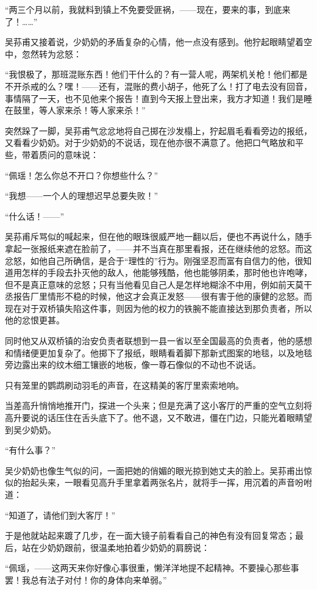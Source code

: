 \par “两三个月以前，我就料到镇上不免要受匪祸，——现在，要来的事，到底来了！……”
\par 吴荪甫又接着说，少奶奶的矛盾复杂的心情，他一点没有感到。他狞起眼睛望着空中，忽然转为忿怒：
\par “我恨极了，那班混账东西！他们干什么的？有一营人呢，两架机关枪！他们都是不开杀戒的么？嘿！——还有，混账的费小胡子，他死了么！打了电去没有回音，事情隔了一天，也不见他来个报告！直到今天报上登出来，我方才知道！我们是睡在鼓里，等人家来杀！等人家来杀！”
\par 突然跺了一脚，吴荪甫气忿忿地将自己掷在沙发榻上，狞起眉毛看看旁边的报纸，又看看少奶奶。对于少奶奶的不说话，现在他亦很不满意了。他把口气略放和平些，带着质问的意味说：
\par “佩瑶！怎么你总不开口？你想些什么？”
\par “我想——一个人的理想迟早总要失败！”
\par “什么话！——”
\par 吴荪甫斥骂似的喊起来，但在他的眼珠很威严地一翻以后，便也不再说什么，随手拿起一张报纸来遮在脸前了，——并不当真在那里看报，还在继续他的忿怒。而这忿怒，如他自己所确信，是合于“理性的”行为。刚强坚忍而富有自信力的他，很知道用怎样的手段去扑灭他的敌人，他能够残酷，他也能够阴柔，那时他也许咆哮，但不是真正意味的忿怒；只有当他看见自己人是怎样地糊涂不中用，例如前天莫干丞报告厂里情形不稳的时候，他这才会真正发怒——很有害于他的康健的忿怒。而现在对于双桥镇失陷这件事，则因为他的权力的铁腕不能直接达到那负责者，所以他的忿恨更甚。
\par 同时他又从双桥镇的治安负责者联想到一县一省以至全国最高的负责者，他的感想和情绪便更加复杂了。他掷下了报纸，眼睛看着脚下那新式图案的地毯，以及地毯旁边露出来的纹木细工镶嵌的地板，像一尊石像似的不动也不说话。
\par 只有笼里的鹦鹉刷动羽毛的声音，在这精美的客厅里索索地响。
\par 当差高升悄悄地推开门，探进一个头来；但是充满了这小客厅的严重的空气立刻将高升要说的话压住在舌头底下了。他不退，又不敢进，僵在门边，只能光着眼睛望到吴少奶奶。
\par “有什么事？”
\par 吴少奶奶也像生气似的问，一面把她的俏媚的眼光掠到她丈夫的脸上。吴荪甫出惊似的抬起头来，一眼看见高升手里拿着两张名片，就将手一挥，用沉着的声音吩咐道：
\par “知道了，请他们到大客厅！”
\par 于是他就站起来踱了几步，在一面大镜子前看看自己的神色有没有回复常态；最后，站在少奶奶跟前，很温柔地拍着少奶奶的肩膀说：
\par “佩瑶，——这两天来你好像心事很重，懒洋洋地提不起精神。不要操心那些事罢！我总有法子对付！你的身体向来单弱。”

